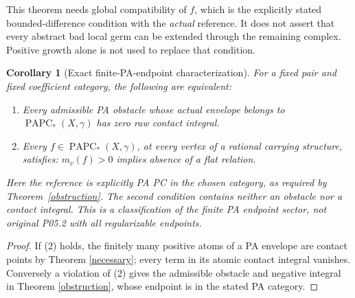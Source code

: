 \documentclass[11pt]{article}
\newtheorem{corollary}[theorem]{Corollary}
\newcommand{\PAPC}{\operatorname{PAPC}}
\begin{document}
This theorem needs global compatibility of \(f\), which is the explicitly
stated bounded-difference condition with the \emph{actual} reference.
It does not assert that every abstract bad local germ can be extended
through the remaining complex. Positive growth alone is not used to
replace that condition.

\begin{corollary}[Exact finite-PA-endpoint characterization]\label{scoped}
For a fixed pair and fixed coefficient category, the following are
equivalent:
\begin{enumerate}
\item Every admissible PA obstacle whose actual envelope belongs to
\(\PAPC_*(X,\gamma)\) has zero raw contact integral.
\item Every \(f\in\PAPC_*(X,\gamma)\), at every vertex of a rational
carrying structure, satisfies: \(m_v(f)>0\) implies absence of a flat
relation.
\end{enumerate}
Here the reference is explicitly PA PC in the chosen category, as required
by Theorem~\ref{obstruction}. The second condition contains neither an
obstacle nor a contact integral.
This is a classification of the finite PA endpoint sector, not original
P05.2 with all regularizable endpoints.
\end{corollary}
\begin{proof}
If (2) holds, the finitely many positive atoms of a PA envelope are
contact points by Theorem \ref{necessary}; every term in its atomic
contact integral vanishes. Conversely a violation of (2) gives the
admissible obstacle and negative integral in Theorem \ref{obstruction},
whose endpoint is in the stated PA category.
\end{proof}
\end{document}
